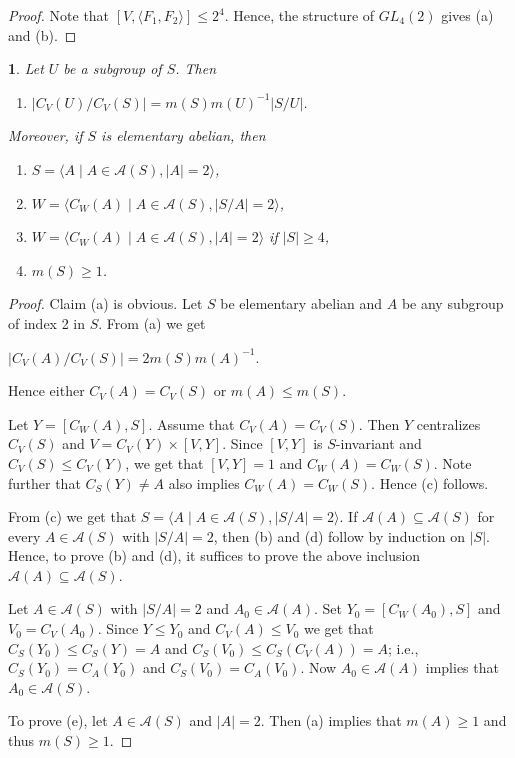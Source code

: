 \documentclass[11pt]{article}
\theoremstyle{plain}
\theoremstyle{stmplain}
\newtheorem{stm}{}[section]
\newcommand{\disp}[1]{\begin{center}$\displaystyle #1$\end{center}}
\begin{document}
\begin{proof}
Note that $[V, \langle F_1, F_2 \rangle] \le 2^4$. Hence, the structure of
$GL_4(2)$ gives (a) and (b).
\end{proof}

\begin{stm}\label{st:1.5}
Let $U$ be a subgroup of $S$. Then
\begin{enumerate}
\item[(a)] $|C_V(U)/C_V(S)| = m(S)m(U)^{-1}|S/U|$.
\end{enumerate}
Moreover, if $S$ is elementary abelian, then
\begin{enumerate}
\item[(b)] $S = \langle A \mid A \in \mathcal{A}(S), |A| = 2 \rangle$,
\item[(c)] $W = \langle C_W(A) \mid A \in \mathcal{A}(S), |S/A| = 2 \rangle$,
\item[(d)] $W = \langle C_W(A) \mid A \in \mathcal{A}(S), |A| = 2 \rangle$ if
  $|S| \ge 4$,
\item[(e)] $m(S) \ge 1$.
\end{enumerate}
\end{stm}

\begin{proof}
Claim (a) is obvious. Let $S$ be elementary abelian and $A$ be any subgroup of
index 2 in $S$. From (a) we get
\disp{|C_V(A)/C_V(S)| = 2m(S)m(A)^{-1}.}
Hence either $C_V(A) = C_V(S)$ or $m(A) \le m(S)$.

\smallskip
\noindent Let $Y = [C_W(A), S]$. Assume that $C_V(A) = C_V(S)$. Then $Y$ centralizes
$C_V(S)$ and $V = C_V(Y) \times [V, Y]$. Since $[V, Y]$ is $S$-invariant and
$C_V(S) \le C_V(Y)$, we get that $[V, Y] = 1$ and $C_W(A) = C_W(S)$. Note
further that $C_S(Y) \ne A$ also implies $C_W(A) = C_W(S)$. Hence (c) follows.

\smallskip
\noindent From (c) we get that $S = \langle A \mid A \in \mathcal{A}(S), |S/A| = 2
\rangle$. If $\mathcal{A}(A) \subseteq \mathcal{A}(S)$ for every $A \in
\mathcal{A}(S)$ with $|S/A| = 2$, then (b) and (d) follow by induction on
$|S|$. Hence, to prove (b) and (d), it suffices to prove the above inclusion
$\mathcal{A}(A) \subseteq \mathcal{A}(S)$.

\smallskip
\noindent Let $A \in \mathcal{A}(S)$ with $|S/A| = 2$ and $A_0 \in
\mathcal{A}(A)$. Set $Y_0 = [C_W(A_0), S]$ and $V_0 = C_V(A_0)$. Since $Y \le
Y_0$ and $C_V(A) \le V_0$ we get that $C_S(Y_0) \le C_S(Y) = A$ and $C_S(V_0)
\le C_S(C_V(A)) = A$; i.e., $C_S(Y_0) = C_A(Y_0)$ and $C_S(V_0) = C_A(V_0)$.
Now $A_0 \in \mathcal{A}(A)$ implies that $A_0 \in \mathcal{A}(S)$.

\smallskip
\noindent To prove (e), let $A \in \mathcal{A}(S)$ and $|A| = 2$. Then (a) implies
that $m(A) \ge 1$ and thus $m(S) \ge 1$.
\end{proof}
\end{document}
